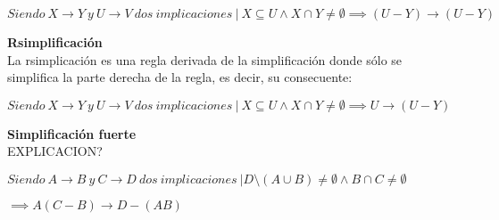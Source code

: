 \begin{center}
    \(Siendo \ X \to Y \ y \ U\to V \ dos \ implicaciones \ | \ X \subseteq U \wedge X \cap Y \neq \emptyset \implies (U - Y) \to (U - Y)\)
\end{center}


\bigskip
\textbf{Rsimplificaci\'on}\\
La rsimplicaci\'on es una regla derivada de la simplificaci\'on donde s\'olo se simplifica la parte derecha de la regla, es decir, su consecuente:

\begin{center}
    \(Siendo \ X \to Y \ y \ U\to V \ dos \ implicaciones \ | \ X \subseteq U \wedge X \cap Y \neq \emptyset \implies U \to (U - Y)\)
\end{center}


\bigskip

% 
\textbf{Simplificaci\'on fuerte}\\

EXPLICACION?

\begin{center}
    \(Siendo \ A \to B \ y \ C\to D \ dos \ implicaciones \ | D \setminus (A \cup B) \neq \emptyset \wedge B \cap C \neq \emptyset\)
\end{center}

\begin{center}
    \(\implies A(C-B) \to D - (AB)\)
\end{center}



